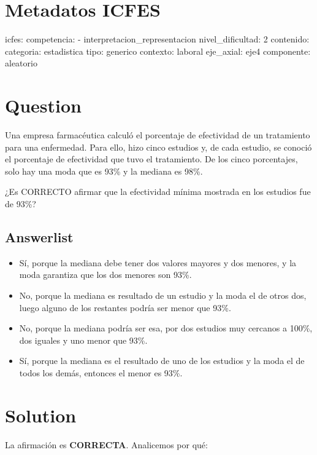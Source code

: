 \documentclass[
]{article}
\author{}
\date{\vspace{-2.5em}}
\providecommand{\tightlist}{%
  \setlength{\itemsep}{0pt}\setlength{\parskip}{0pt}}
\begin{document}
\section{Metadatos ICFES}\label{metadatos-icfes}

icfes: competencia: - interpretacion\_representacion nivel\_dificultad:
2 contenido: categoria: estadistica tipo: generico contexto: laboral
eje\_axial: eje4 componente: aleatorio

\section{Question}\label{question}

Una empresa farmacéutica calculó el porcentaje de efectividad de un
tratamiento para una enfermedad. Para ello, hizo cinco estudios y, de
cada estudio, se conoció el porcentaje de efectividad que tuvo el
tratamiento. De los cinco porcentajes, solo hay una moda que es 93\% y
la mediana es 98\%.

¿Es CORRECTO afirmar que la efectividad mínima mostrada en los estudios
fue de 93\%?

\subsection{Answerlist}\label{answerlist}

\begin{itemize}
\tightlist
\item
  Sí, porque la mediana debe tener dos valores mayores y dos menores, y
  la moda garantiza que los dos menores son 93\%.
\item
  No, porque la mediana es resultado de un estudio y la moda el de otros
  dos, luego alguno de los restantes podría ser menor que 93\%.
\item
  No, porque la mediana podría ser esa, por dos estudios muy cercanos a
  100\%, dos iguales y uno menor que 93\%.
\item
  Sí, porque la mediana es el resultado de uno de los estudios y la moda
  el de todos los demás, entonces el menor es 93\%.
\end{itemize}

\section{Solution}\label{solution}

La afirmación es \textbf{CORRECTA}. Analicemos por qué:
\end{document}
